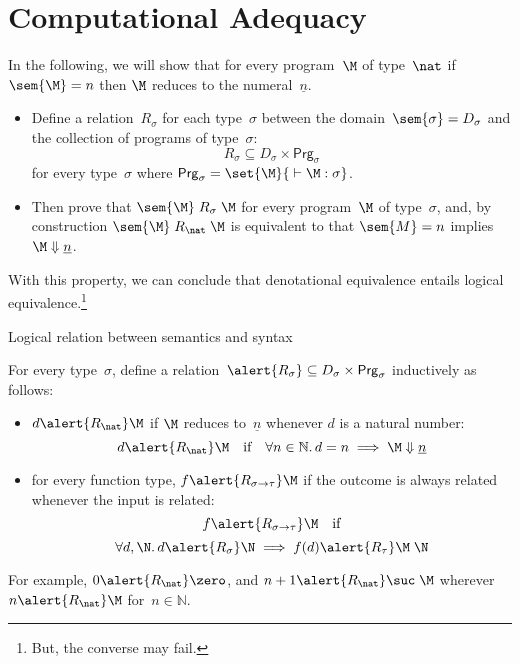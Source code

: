 \section{Computational Adequacy}
\begin{frame}
  In the following, we will show that for every program~$\M$ of type~$\nat$ if
  $\sem{\M} = n$ then $\M$ reduces to the numeral~$\underline{n}$.
  \begin{itemize}
    \item Define a relation~$R_\sigma$ for each type~$\sigma$ between the
      domain~$\sem{\sigma} = D_\sigma$ and the collection of
      programs of type~$\sigma$:
      \[
        R_\sigma \subseteq D_\sigma \times \mathsf{Prg}_\sigma
      \]
      for every type~$\sigma$ where $\mathsf{Prg}_\sigma = \set{ \M }{{}\vdash
        \M : \sigma}$.
    \item Then prove that $\sem{\M}\mathrel{R_\sigma} \M$ for every
      program~$\M$ of type~$\sigma$, and, by construction
      $\sem{\M} \mathrel{R_\nat} \M$ is equivalent to that
      $\sem{M} = n$ implies $\M \Downarrow \underline{n}$. 
  \end{itemize}
  With this property, we can conclude that denotational equivalence entails
  logical equivalence.\footnote{
    But, the converse may fail. 
  }
\end{frame}
\begin{frame}{Logical relation between semantics and syntax}
\begin{definition}
  For every type~$\sigma$, define a relation~$\alert{R_\sigma} \subseteq
  D_\sigma \times \mathsf{Prg}_\sigma$ inductively as follows:
  \begin{itemize}
    \item $d \alert{\mathrel{R_\nat}}\M$
      if $\M$ reduces to~$\underline{n}$
      whenever $d$ is a natural number:
      \[
        d \alert{\mathrel{R_\nat}} \M
        \quad\text{if}\quad \forall n \in \mathbb{N}.\,
        d = n \implies \M \Downarrow \underline{n}
      \]
    \item for every function type, $f \alert{\mathrel{R_{\sigma\to\tau}}} \M$
      if the outcome is always related whenever the input is related:
      \[
        f \alert{\mathrel{R_{\sigma\to\tau}}} \M
        \quad\text{if}
      \]
      \[
        \forall d, 
        \N.\, 
        d \alert{\mathrel{R}_\sigma} \N \implies f(d) \alert{\mathrel{R_\tau}} \M\;\N
      \]
  \end{itemize}
\end{definition}
For example, $0 \alert{\mathrel{R_\nat}} \zero$, and
$n + 1 \alert{\mathrel{R_\nat}}
\suc\;\M$ wherever $n \alert{\mathrel{R_\nat}} \M$ for~$n \in \mathbb{N}$. 

\end{frame}
